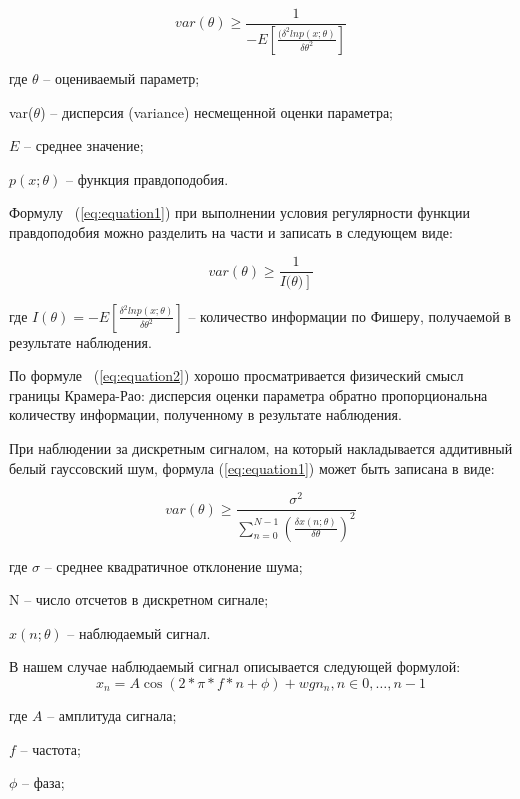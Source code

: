 \begin{equation}
	\label{eq:equation1}
	var(\theta)\geq\frac{1}{-E\left[\frac{(\delta^2 ln p(x;\theta)}{\delta\theta^2}\right]}
\end{equation}

где $\theta$ -- оцениваемый параметр; 

var($\theta$) -- дисперсия (variance) несмещенной оценки параметра;

$E$ -- среднее значение;

$p(x;\theta)$ -- функция правдоподобия.

Формулу ~(\ref{eq:equation1}) при выполнении условия регулярности функции правдоподобия можно разделить на части и записать в следующем виде:

\begin{equation}
	\label{eq:equation2}
	var(\theta)\geq\frac{1}{I(\left.\theta)\right]}
\end{equation}

где $I(\theta)=-E\left[\frac{\delta^2 ln p(x;\theta)}{\delta\theta^2}\right]$ -- количество информации по Фишеру, получаемой в результате наблюдения.

По формуле ~(\ref{eq:equation2}) хорошо просматривается физический смысл границы Крамера-Рао: дисперсия оценки параметра обратно пропорциональна количеству информации, полученному в результате наблюдения.

При наблюдении за дискретным сигналом, на который накладывается аддитивный белый гауссовский шум, формула (\ref{eq:equation1}) может быть записана в виде: 

\begin{equation}
	\label{eq:equation3}
	var(\theta)\geq\frac{\sigma^2}{\sum_{n=0}^{N-1}\left(\frac{\delta x(n;\theta)}{\delta\theta}\right)^2}
\end{equation}

где $\sigma $ -- среднее квадратичное отклонение шума;

N -- число отсчетов в дискретном сигнале;

$x(n;\theta)$ -- наблюдаемый сигнал.

В нашем случае наблюдаемый сигнал описывается следующей формулой:
\begin{equation}
	\label{eq:equation4}
	x_n=A\cos(2*\pi*f*n+\phi)+wgn_n, n\in0,…,n-1
\end{equation}

где $A$ -- амплитуда сигнала;

$f$ -- частота;

$\phi$ -- фаза;

